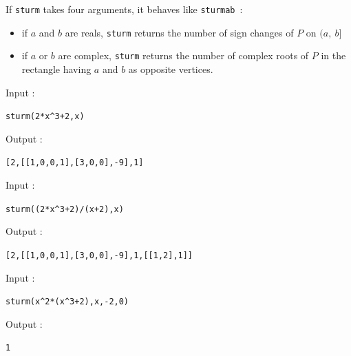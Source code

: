 \documentclass[a4paper,11pt]{book}
\begin{document}
If {\tt sturm} takes four arguments, it behaves like {\tt sturmab}~:
\begin{itemize}
\item if $a$ and $b$ are reals, 
{\tt sturm} returns the number of sign changes of $P$ on $(a,\ b]$
\item if $a$ or $b$ are complex, 
{\tt sturm} returns the number of complex roots of $P$ in the rectangle 
having $a$ and $b$ as opposite vertices.
\end{itemize} 
Input :
\begin{center}{\tt sturm(2*x\verb|^|3+2,x)}\end{center}
Output :
\begin{center}{\tt [2,[[1,0,0,1],[3,0,0],-9],1]}\end{center}
Input :
\begin{center}{\tt sturm((2*x\verb|^|3+2)/(x+2),x)}\end{center}
Output :
\begin{center}{\tt [2,[[1,0,0,1],[3,0,0],-9],1,[[1,2],1]]}\end{center}
Input :
\begin{center}{\tt sturm(x\verb|^|2*(x\verb|^|3+2),x,-2,0)}\end{center}
Output :
\begin{center}{\tt 1}\end{center}
\end{document}
